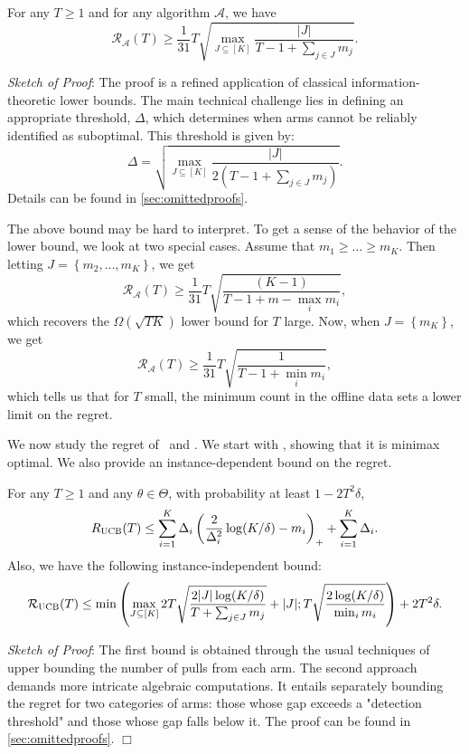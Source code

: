 \begin{theorem}\label{prop:lowerboundminimax}
For any $T\geq 1$ and for any algorithm $\mathcal{A}$, we have
    \begin{equation*}
 \mathcal{R}_{\mathcal{A}}(T)\geq \frac{1}{31} T\sqrt{\max_{J\subseteq [K]}\frac{|J|}{T-1+\sum_{j\in J} m_j}}.
\end{equation*}
\end{theorem}
\textit{Sketch of Proof}: The proof is a refined application of classical information-theoretic lower bounds. The main technical challenge lies in defining an appropriate threshold, $\Delta$, which determines when arms cannot be reliably identified as suboptimal. This threshold is given by:  
\[
\Delta = \sqrt{\max_{J \subseteq [K]} \frac{|J|}{2(T - 1 + \sum_{j \in J} m_j)}}.
\]  Details can be found in \cref{sec:omittedproofs}.


The above bound may be hard to interpret. To get a sense of the behavior of the lower bound, we look at two special cases. Assume that $m_1\geq \ldots \geq m_K$. Then letting $J=\left\{m_2,\ldots, m_K\right\}$, we get
\begin{equation*}
 \mathcal{R}_{\mathcal{A}}(T)\geq \frac{1}{31} T\sqrt{\frac{(K-1)}{T-1+m-\max_i m_i}},
\end{equation*}
which recovers the $\Omega(\sqrt{TK})$ lower bound for $T$ large. Now, when $J=\left\{ m_K\right\}$, we get
\begin{equation*}
\mathcal{R}_{\mathcal{A}}(T)\geq \frac{1}{31} T\sqrt{\frac{1}{T-1+\min_i m_i}},
\end{equation*}
 which tells us that for $T$ small, the minimum count in the offline data sets a lower limit on the regret. 

We now study the regret of \algucb\ and \alglcb. We start with \algucb, showing that it is minimax optimal. We also provide an instance-dependent bound on the regret.

\begin{theorem}\label{prop:regretminimaxucb}
    For any $T\geq 1$ and any $\theta\in \Theta$, with probability at least $1-2T^2\delta$,
    \[
R_\textsc{UCB}(T)\leq \sum_{i=1}^K \Delta_i\left( \frac{2}{\Delta_i^2} \log(K/\delta)-m_i\right)_++\sum_{i=1}^K \Delta_i.
    \]
    Also, we have the following instance-independent bound: 
    \[
\mathcal{R}_{\textsc{UCB}}(T)\leq \min\left( \max_{J\subseteq [K]}2T\sqrt{\frac{2|J|\log(K/\delta)}{T+\sum_{j\in J}m_j}}+|J|;T\sqrt{\frac{2\log(K/\delta)}{\min_i m_i}}\right)+2T^2\delta.
    \]
 \end{theorem}
\textit{Sketch of Proof}: The first bound is obtained through the usual techniques of upper bounding the number of pulls from each arm. The second approach demands more intricate algebraic computations. It entails separately bounding the regret for two categories of arms: those whose gap exceeds a "detection threshold" and those whose gap falls below it. The proof can be found in \cref{sec:omittedproofs}. \hfill \(\Box\)

